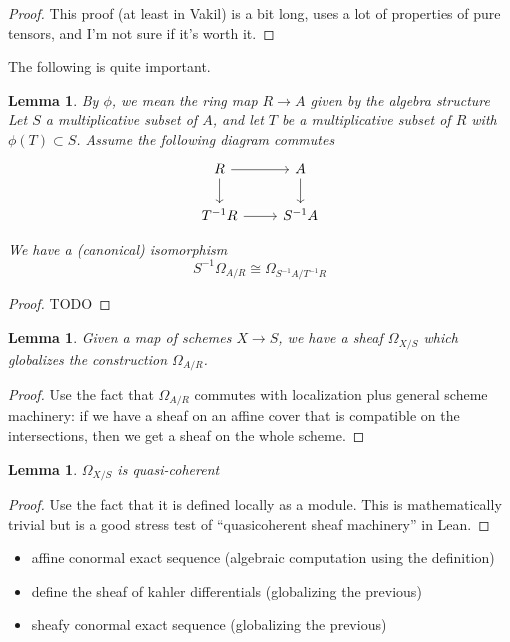 \documentclass[a4paper]{article}
\newtheorem{lem}[thm]{Lemma}
\newcommand{\isom}{\cong}
\newcommand{\ins}{\subset}
\begin{document}
\begin{proof}
	This proof (at least in Vakil) is a bit long, uses a lot 
	of properties of pure tensors, and I'm not sure
	if it's worth it.
\end{proof}

The following is quite important.
\begin{lem}
	By \(\phi\), we mean the ring map \(R \to A\) 
	given by the algebra structure
	Let \(S\) a multiplicative subset of \(A\),
	and let \(T\) be a multiplicative subset
	of \(R\) with \(\phi(T) \ins S\).
	Assume the following diagram commutes
	\[
	\begin{tikzcd}
	R \arrow{r}{} \arrow{d}[swap]{} &
	A \arrow{d}{} \\
	T^{-1}R \arrow{r}{} &
	S^{-1}A
	\end{tikzcd}
	\]
	
	We have a (canonical) isomorphism
	\[
	S^{-1}\Omega_{A / R} \isom
	\Omega_{S^{-1}A / T^{-1}R}	
	\] 
\end{lem}

\begin{proof}
	TODO
\end{proof}

\begin{lem}
	Given a map of schemes 
	\(X \to S\),
	we have a 
	sheaf \(\Omega_{X / S}\) 
	which globalizes the construction
	\(\Omega_{A / R}\).
\end{lem}

\begin{proof}
	Use the fact that 
	\(\Omega_{A / R}\)
	commutes with localization 
	plus general scheme machinery:
	if we have a sheaf on an affine 
	cover that is compatible on the intersections,
	then we get a sheaf on the whole scheme.
\end{proof}

\begin{lem}
	\(\Omega_{X / S}\) is quasi-coherent
\end{lem}

\begin{proof}
	Use the fact that it is defined locally
	as a module.
	This is mathematically trivial but 
	is a good stress test of 
	``quasicoherent sheaf machinery''
	in Lean.
\end{proof}

\begin{itemize}
    \item affine conormal exact sequence
		(algebraic computation using the definition)
	\item define the sheaf of kahler differentials
		(globalizing the previous)
	\item sheafy conormal exact sequence
		(globalizing the previous)
\end{itemize}
\end{document}
